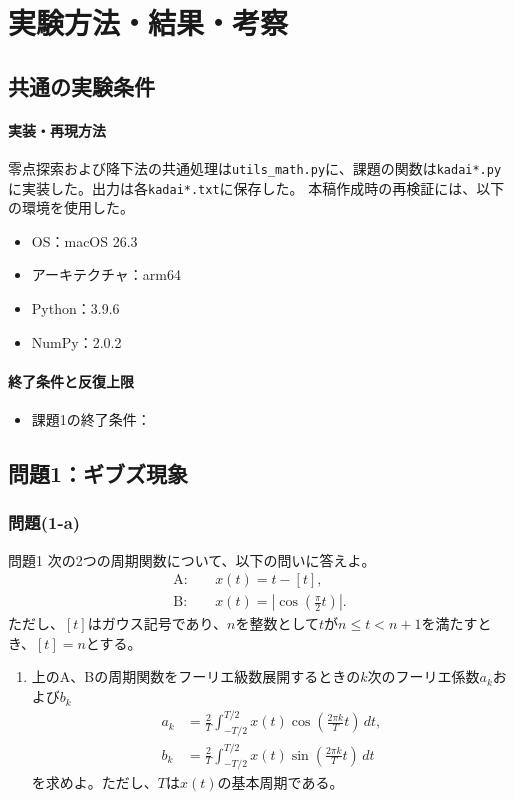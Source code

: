 \documentclass[a4j]{jarticle}
\begin{document}
\clearpage
\section{実験方法・結果・考察}
\label{sec:experiment}
\subsection{共通の実験条件}
\paragraph{実装・再現方法}
零点探索および降下法の共通処理は\texttt{utils\_math.py}に、課題の関数は\texttt{kadai*.py}に実装した。出力は各\texttt{kadai*.txt}に保存した。
本稿作成時の再検証には、以下の環境を使用した。
\begin{itemize}
  \item OS：macOS 26.3
  \item アーキテクチャ：arm64
  \item Python：3.9.6
  \item NumPy：2.0.2
\end{itemize}

\paragraph{終了条件と反復上限}
\begin{itemize}
  \item 課題1の終了条件：
\end{itemize}

\subsection{問題1：ギブズ現象}
\subsubsection{問題(1-a)}
\begin{itembox}[l]{問題1}
次の2つの周期関数について、以下の問いに答えよ。
\[
  \begin{aligned}
    \mathrm{A}:\quad & x(t)=t-[t],\\
    \mathrm{B}:\quad & x(t)=\left|\cos\left(\frac{\pi}{2}t\right)\right|.
  \end{aligned}
\]
ただし、$[t]$はガウス記号であり、$n$を整数として$t$が$n\le t<n+1$を満たすとき、$[t]=n$とする。
\begin{enumerate}
  \item[(a)] 上のA、Bの周期関数をフーリエ級数展開するときの$k$次のフーリエ係数$a_k$および$b_k$
  \[
    \begin{aligned}
      a_k&=\frac{2}{T}\int_{-T/2}^{T/2}x(t)\cos\left(\frac{2\pi k}{T}t\right)\,dt,\\
      b_k&=\frac{2}{T}\int_{-T/2}^{T/2}x(t)\sin\left(\frac{2\pi k}{T}t\right)\,dt
    \end{aligned}
  \]
  を求めよ。ただし、$T$は$x(t)$の基本周期である。
\end{enumerate}
\end{itembox}
\end{document}
